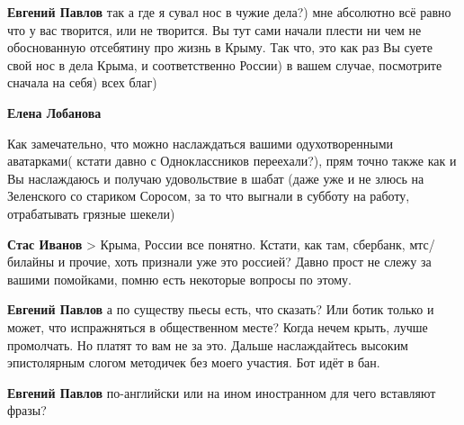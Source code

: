 \begin{itemize}
\begin{itemize}
\textbf{Евгений Павлов} так а где я сувал нос в чужие дела?) мне абсолютно всё равно что у вас творится, или не творится. Вы тут сами начали плести ни чем не обоснованную отсебятину про жизнь в Крыму. Так что, это как раз Вы суете свой нос в дела Крыма, и соответственно России) в вашем случае, посмотрите сначала на себя) всех благ)

 
\textbf{Елена Лобанова} 

Как замечательно, что можно наслаждаться вашими одухотворенными аватарками(
кстати давно с Одноклассников переехали?), прям точно также как и Вы
наслаждаюсь и получаю удовольствие в шабат (даже уже и не злюсь на Зеленского
со стариком Соросом, за то что выгнали в субботу на работу, отрабатывать
грязные шекели)

 
\textbf{Стас Иванов} > Крыма, России все понятно. Кстати, как там, сбербанк,
мтс/билайны и прочие, хоть признали уже это россией? Давно прост не слежу за
вашими помойками, помню есть некоторые вопросы по этому.

 
\textbf{Евгений Павлов} а по существу пьесы есть, что сказать? Или ботик только и может, что испражняться в общественном месте? Когда нечем крыть, лучше промолчать. Но платят то вам не за это. Дальше наслаждайтесь высоким эпистолярным слогом методичек без моего участия. Бот идёт в бан.

 
\textbf{Евгений Павлов} по-английски или на ином иностранном для чего вставляют фразы?

 

\end{itemize}
\end{itemize}
